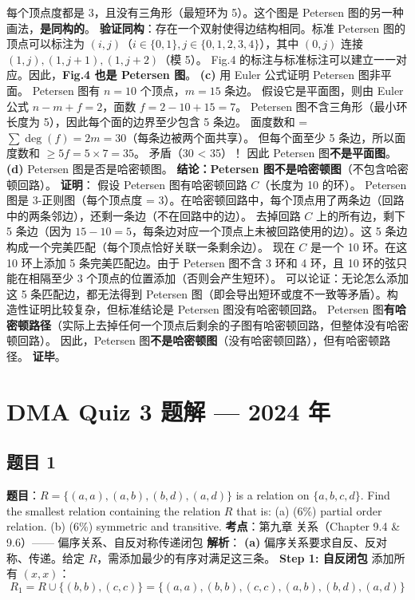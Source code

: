 \documentclass[10pt,a4paper,openany]{ctexbook}
\theoremstyle{definition}
\theoremstyle{remark}
\begin{document}
每个顶点度都是 3，且没有三角形（最短环为 5）。这个图是 Petersen 图的另一种画法，\textbf{是同构的}。
\textbf{验证同构}：存在一个双射使得边结构相同。标准 Petersen 图的顶点可以标注为 $(i, j)$（$i \in \{0,1\}, j \in \{0,1,2,3,4\}$），其中 $(0,j)$ 连接 $(1,j), (1,j+1), (1,j+2)$（模 5）。
Fig.4 的标注与标准标注可以建立一一对应。因此，\textbf{Fig.4 也是 Petersen 图}。
\textbf{(c)} 用 Euler 公式证明 Petersen 图非平面。
Petersen 图有 $n = 10$ 个顶点，$m = 15$ 条边。
假设它是平面图，则由 Euler 公式 $n - m + f = 2$，面数 $f = 2 - 10 + 15 = 7$。
Petersen 图不含三角形（最小环长度为 5），因此每个面的边界至少包含 5 条边。
面度数和 = $\sum \deg(f) = 2m = 30$（每条边被两个面共享）。
但每个面至少 5 条边，所以面度数和 $\geq 5f = 5 \times 7 = 35$。
矛盾（30 < 35）！
因此 Petersen 图\textbf{不是平面图}。
\textbf{(d)} Petersen 图是否是哈密顿图。
\textbf{结论：Petersen 图不是哈密顿图}（不包含哈密顿回路）。
\textbf{证明}：
假设 Petersen 图有哈密顿回路 $C$（长度为 10 的环）。
Petersen 图是 3-正则图（每个顶点度 = 3）。在哈密顿回路中，每个顶点用了两条边（回路中的两条邻边），还剩一条边（不在回路中的边）。
去掉回路 $C$ 上的所有边，剩下 5 条边（因为 $15 - 10 = 5$，每条边对应一个顶点上未被回路使用的边）。这 5 条边构成一个完美匹配（每个顶点恰好关联一条剩余边）。
现在 $C$ 是一个 10 环。在这 10 环上添加 5 条完美匹配边。由于 Petersen 图不含 3 环和 4 环，且 10 环的弦只能在相隔至少 3 个顶点的位置添加（否则会产生短环）。
可以论证：无论怎么添加这 5 条匹配边，都无法得到 Petersen 图（即会导出短环或度不一致等矛盾）。构造性证明比较复杂，但标准结论是 Petersen 图没有哈密顿回路。
Petersen 图\textbf{有哈密顿路径}（实际上去掉任何一个顶点后剩余的子图有哈密顿回路，但整体没有哈密顿回路）。
因此，Petersen 图\textbf{不是哈密顿图}（没有哈密顿回路），但有哈密顿路径。
\textbf{证毕}。


\section{DMA Quiz 3 题解 — 2024 年}

\subsection{题目 1}

\textbf{题目}：$R = \{(a,a), (a,b), (b,d), (a,d)\}$ is a relation on $\{a,b,c,d\}$. Find the smallest relation containing the relation $R$ that is:
(a) (6\%) partial order relation.
(b) (6\%) symmetric and transitive.
\textbf{考点}：第九章 关系（Chapter 9.4 \& 9.6）—— 偏序关系、自反对称传递闭包
\textbf{解析}：
\textbf{(a)} 偏序关系要求自反、反对称、传递。给定 $R$，需添加最少的有序对满足这三条。
\textbf{Step 1: 自反闭包}
添加所有 $(x,x)$：
\[
R_1 = R \cup \{(b,b), (c,c)\} = \{(a,a), (b,b), (c,c), (a,b), (b,d), (a,d)\}
\]
\end{document}
